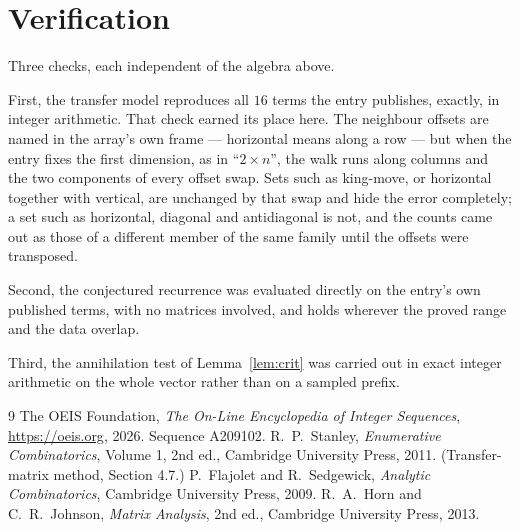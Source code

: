 \documentclass[11pt,a4paper]{article}
\theoremstyle{plain}
\theoremstyle{definition}
\begin{document}
\section{Verification}

Three checks, each independent of the algebra above.

First, the transfer model reproduces all $16$ terms the entry publishes, exactly, in
integer arithmetic. That check earned its place here. The neighbour offsets are named in the
array's own frame --- horizontal means along a row --- but when the entry fixes the first
dimension, as in ``$2\times n$'', the walk runs along columns and the two components of every
offset swap. Sets such as king-move, or horizontal together with vertical, are unchanged by
that swap and hide the error completely; a set such as horizontal, diagonal and antidiagonal
is not, and the counts came out as those of a different member of the same family until the
offsets were transposed.

Second, the conjectured recurrence was evaluated directly on the entry's own published terms,
with no matrices involved, and holds wherever the proved range and the data overlap.

Third, the annihilation test of Lemma~\ref{lem:crit} was carried out in exact integer
arithmetic on the whole vector rather than on a sampled prefix.

\begin{thebibliography}{9}
 The OEIS Foundation, \emph{The On-Line Encyclopedia of Integer
Sequences}, \url{https://oeis.org}, 2026. Sequence A209102.
 R.~P.~Stanley, \emph{Enumerative Combinatorics}, Volume 1, 2nd ed.,
Cambridge University Press, 2011. (Transfer-matrix method, Section 4.7.)
 P.~Flajolet and R.~Sedgewick, \emph{Analytic Combinatorics}, Cambridge
University Press, 2009.
 R.~A.~Horn and C.~R.~Johnson, \emph{Matrix Analysis}, 2nd ed., Cambridge
University Press, 2013.
\end{thebibliography}
\end{document}
